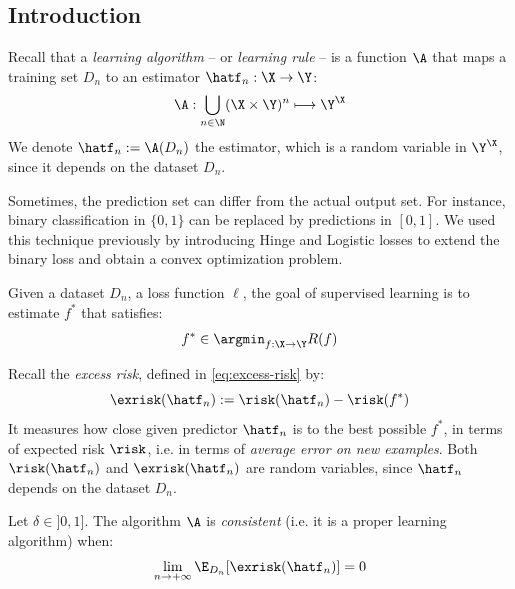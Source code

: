 \documentclass[toc, titlepaged]{../cs-classes/cs-classes}
\begin{document}
\subsection{Introduction}
Recall that a \emph{learning algorithm} -- or \emph{learning rule} -- is a function $\A$ that maps a training set $D_n$ to an estimator $\hatf_n : \X\to\Y$:
    \begin{equation*}
        \A : \bigcup_{n\in\N}(\X\times\Y)^n \longmapsto \Y^\X
    \end{equation*}
    We denote $\hatf_n := \A(D_n)$ the estimator, which is a random variable in $\Y^\X$, since it depends on the dataset $D_n$.
\begin{remark}
    Sometimes, the prediction set can differ from the actual output set. For instance, binary classification in $\{0, 1\}$ can be replaced by predictions in $[0, 1]$. We used this technique previously by introducing Hinge and Logistic losses to extend the binary loss and obtain a convex optimization problem.
\end{remark}

\begin{definition}
    Given a dataset $D_n$, a loss function $\ell$, the goal of supervised learning is to estimate $f^*$ that satisfies:
    \begin{equation*}
        f^*\in\argmin_{f:\X\to\Y} R(f)
    \end{equation*}
\end{definition}

Recall the \emph{excess risk}, defined in \eqref{eq:excess-risk} by:
\begin{equation*}
    \exrisk(\hatf_n) := \risk(\hatf_n) - \risk(f^*)
\end{equation*}
It measures how close given predictor $\hatf_n$ is to the best possible $f^*$, in terms of expected risk $\risk$, i.e. in terms of \emph{average error on new examples}. Both $\risk(\hatf_n)$ and $\exrisk(\hatf_n)$ are random variables, since $\hatf_n$ depends on the dataset $D_n$.

\begin{definition}[Consistency]
    Let $\delta\in]0,1]$. The algorithm $\A$ is \emph{consistent} (i.e. it is a proper learning algorithm) when:
    \begin{equation*}
        \lim_{n\to+\infty} \E_{D_n}[\exrisk(\hatf_n)] = 0
    \end{equation*}
\end{definition}
\end{document}
